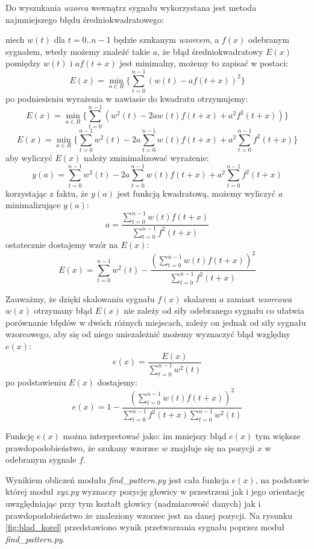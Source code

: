 Do wyszukania \textit{wzorca} wewnątrz sygnału wykorzystana jest metoda najmniejszego błędu średniokwadratowego:

niech $w(t)$  dla $t = 0..n-1$ będzie szukanym \textit{wzorcem}, a $f(x)$ odebranym sygnałem,
wtedy możemy znaleźć takie $a$, że błąd średniokwadratowy $E(x)$ pomiędzy $w(t)$ i $a f(t+x)$ jest minimalny,
możemy to zapisać w postaci:
\[
  E(x) = \min_{a \in R} \{ \sum_{t=0}^{n-1}  (w(t) - a f(t+x))^2 \}
\]
po podniesieniu wyrażenia w nawiasie do kwadratu otrzymujemy:
\[
  E(x) = \min_{a \in R} \{ \sum_{t=0}^{n-1}  (w^2(t) -2a w(t) f(t+x) + a^2 f^2(t+x)) \}
\]
\[
  E(x) = \min_{a \in R} \{ \sum_{t=0}^{n-1}  w^2(t) -2a \sum_{t=0}^{n-1}  w(t) f(t+x) + a^2 \sum_{t=0}^{n-1} f^2(t+x) \}
\]
aby wyliczyć $E(x)$ należy zminimalizować wyrażenie:
\[
  y(a) = \sum_{t=0}^{n-1}  w^2(t) -2a \sum_{t=0}^{n-1}  w(t) f(t+x) + a^2 \sum_{t=0}^{n-1} f^2(t+x)
\]
 korzystając z faktu, że $y(a)$ jest funkcją kwadratową, możemy wyliczyć $a$ minimalizujące $y(a)$:
\[
 a = \frac{ \sum\limits_{t=0}^{n-1}  w(t) f(t+x) }{ \sum\limits_{t=0}^{n-1} f^2(t+x) }
\]
ostatecznie dostajemy wzór na $E(x)$:
\[
  E(x) = \sum_{t=0}^{n-1}  w^2(t)  - \frac {(\sum\limits_{t=0}^{n-1}  w(t) f(t+x) )^2 } { \sum\limits_{t=0}^{n-1} f^2(t+x)}
\]

Zauważmy, że dzięki skalowaniu sygnału $f(x)$ skalarem $a$ zamiast \textit{wzorcowa} $w(x)$
otrzymany błąd $E(x)$ nie zależy od siły odebranego sygnału co ułatwia porównanie błędów w dwóch różnych miejscach,
zależy on jednak od siły sygnału wzorcowego, aby się od niego uniezależnić możemy wyznaczyć
błąd względny $e(x)$:
\[
  e(x) = \frac{E(x)}{\sum\limits_{t=0}^{n-1}  w^2(t)}
\]
po podstawieniu $E(x)$ dostajemy:
\[
  e(x) = 1 - \frac {(\sum\limits_{t=0}^{n-1}  w(t) f(t+x) )^2 } { \sum\limits_{t=0}^{n-1} f^2(t+x) \sum\limits_{t=0}^{n-1}  w^2(t)}
\]
 
 Funkcję $e(x)$  można interpretować jako:
 im mniejszy błąd $e(x)$ tym większe prawdopodobieństwo, że szukany wzorzec $w$ znajduje się na pozycji $x$ w 
 odebranym sygnale $f$. 

 Wynikiem obliczeń modułu \textit{find\_pattern.py} jest cała funkcja $e(x)$, na podstawie której moduł \textit{xyz.py}
 wyznaczy pozycję głowicy w przestrzeni jak i jego orientację uwzględniając przy tym 
 kształt głowicy (nadmiarowość danych) jak i prawdopodobieństwo że znaleziony wzorzec jest na danej pozycji.
 Na rysunku \ref{fig:blad_korel} przedstawiono wynik przetwarzania sygnału poprzez moduł \textit{find\_pattern.py}.

